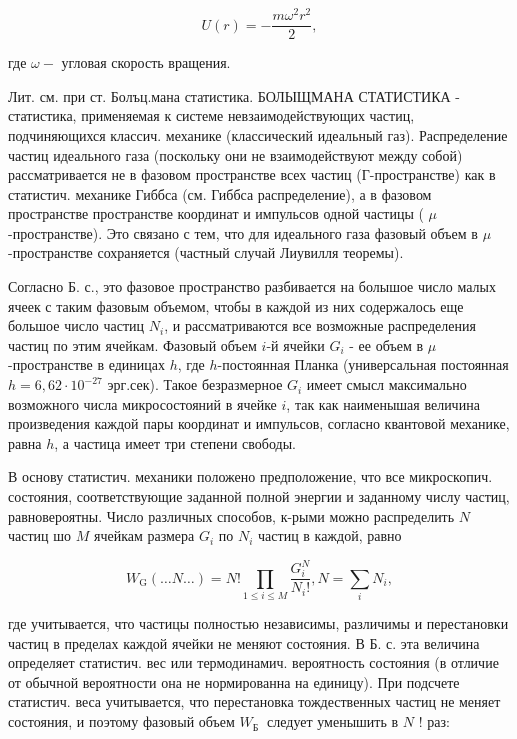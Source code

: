 \documentclass[10pt]{article}
\begin{document}
\[

U(r)=-\frac{m \omega^{2} r^{2}}{2},

\]



где $\omega-$ угловая скорость вращения.



Лит. см. при ст. Болъц.мана статистика. БОЛЫЩМАНА СТАТИСТИКА - статистика, применяемая к системе невзаимодействующих частиц, подчиняющихся классич. механике (классический идеальный газ). Распределение частиц идеального газа (поскольку они не взаимодействуют между собой) рассматривается не в фазовом пространстве всех частиц (Г-пространстве) как в статистич. механике Гиббса (см. Гиббса распределение), а в фазовом пространстве пространстве координат и импульсов одной частицы ( $\mu$-пространстве). Это связано с тем, что для идеального газа фазовый объем в $\mu$-пространстве сохраняется (частный случай Лиувилля теоремы).



Согласно Б. с., это фазовое пространство разбивается на болышое число малых ячеек с таким фазовым объемом, чтобы в каждой из них содержалось еще большое число частиц $N_{i}$, и рассматриваются все возможные распределения частиц по этим ячейкам. Фазовый объем $i$-й ячейки $G_{i}$ - ее объем в $\mu$-пространстве в единицах $h$, где $h$-постоянная Планка (универсальная постоянная $h=6,62 \cdot 10^{-27}$ эрг.сек). Такое безразмерное $G_{i}$ имеет смысл максимально возможного числа микросостояний в ячейке $i$, так как наименышая величина произведения каждой пары координат и импульсов, согласно квантовой механике, равна $h$, а частица имеет три степени свободы.



В основу статистич. механики положено предположение, что все микроскопич. состояния, соответствующие заданной полной энергии и заданному числу частиц, равновероятны. Число различных способов, к-рыми можно распределить $N$ частиц шо $M$ ячейкам размера $G_{i}$ по $N_{i}$ частиц в каждой, равно



\[

W_{\mathrm{G}}(\ldots N \ldots)=N ! \prod_{1 \leqslant i \leqslant M} \frac{G_{i}^{N}}{N_{i} !}, N=\sum_{i} N_{i},

\]



где учитывается, что частицы полностью независимы, различимы и перестановки частиц в пределах каждой ячейки не меняют состояния. В Б. с. эта величина определяет статистич. вес или термодинамич. вероятность состояния (в отличие от обычной вероятности она не нормированна на единицу). При подсчете статистич. веса учитывается, что перестановка тождественных частиц не меняет состояния, и поэтому фазовый объем $W_{\text {Б }}$ следует уменышить в $N$ ! раз:
\end{document}
